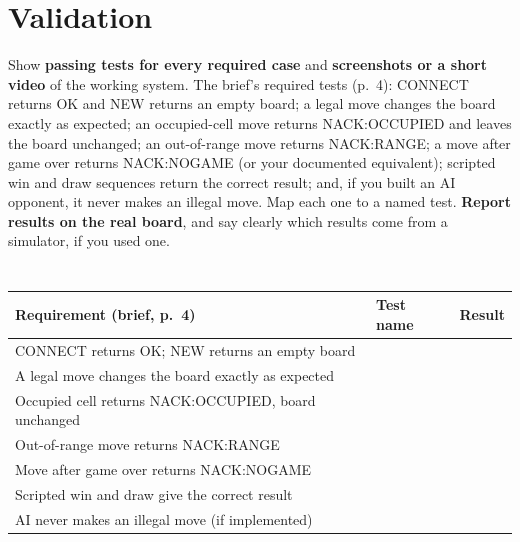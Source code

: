 \section{Validation}
\label{sec:valid}

\begin{guidance}
Show \textbf{passing tests for every required case} and \textbf{screenshots or a
short video} of the working system. The brief's required tests (p.~4):
CONNECT returns OK and NEW returns an empty board; a legal move changes the
board exactly as expected; an occupied-cell move returns NACK:OCCUPIED and
leaves the board unchanged; an out-of-range move returns NACK:RANGE; a move
after game over returns NACK:NOGAME (or your documented equivalent); scripted
win and draw sequences return the correct result; and, if you built an AI
opponent, it never makes an illegal move. Map each one to a named test.
\textbf{Report results on the real board}, and say clearly which results come
from a simulator, if you used one.
\end{guidance}

\subsection{}

\subsection{}

\begin{table}[t]
\centering
\caption{}
\label{tab:required}
\footnotesize
\begin{tabular}{@{}L{5.1cm}L{1.6cm}c@{}}
\toprule
Requirement (brief, p.~4) & Test name & Result \\
\midrule
CONNECT returns OK; NEW returns an empty board &  &  \\
A legal move changes the board exactly as expected &  &  \\
Occupied cell returns NACK:OCCUPIED, board unchanged &  &  \\
Out-of-range move returns NACK:RANGE &  &  \\
Move after game over returns NACK:NOGAME &  &  \\
Scripted win and draw give the correct result &  &  \\
AI never makes an illegal move (if implemented) &  &  \\
\bottomrule
\end{tabular}
\end{table}

